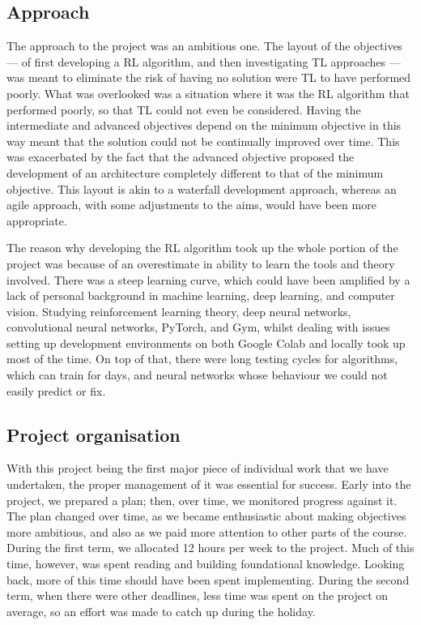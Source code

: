 \documentclass[12pt,a4paper]{article}
\begin{document}
\subsection{Approach}
The approach to the project was an ambitious one. The layout of the objectives --- of first developing a RL algorithm, and then investigating TL approaches --- was meant to eliminate the risk of having no solution were TL to have performed poorly. What was overlooked was a situation where it was the RL algorithm that performed poorly, so that TL could not even be considered. Having the intermediate and advanced objectives depend on the minimum objective in this way meant that the solution could not be continually improved over time. This was exacerbated by the fact that the advanced objective proposed the development of an architecture completely different to that of the minimum objective. This layout is akin to a waterfall development approach, whereas an agile approach, with some adjustments to the aims, would have been more appropriate. 

The reason why developing the RL algorithm took up the whole portion of the project was because of an overestimate in ability to learn the tools and theory involved. There was a steep learning curve, which could have been amplified by a lack of personal background in machine learning, deep learning, and computer vision. Studying reinforcement learning theory, deep neural networks, convolutional neural networks, PyTorch, and Gym, whilst dealing with issues setting up development environments on both Google Colab and locally took up most of the time. On top of that, there were long testing cycles for algorithms, which can train for days, and neural networks whose behaviour we could not easily predict or fix.

\subsection{Project organisation}
With this project being the first major piece of individual work that we have undertaken, the proper management of it was essential for success. Early into the project, we prepared a plan; then, over time, we monitored progress against it. The plan changed over time, as we became enthusiastic about making objectives more ambitious, and also as we paid more attention to other parts of the course. During the first term, we allocated 12 hours per week to the project. Much of this time, however, was spent reading and building foundational knowledge. Looking back, more of this time should have been spent implementing. During the second term, when there were other deadlines, less time was spent on the project on average, so an effort was made to catch up during the holiday. 
\end{document}
